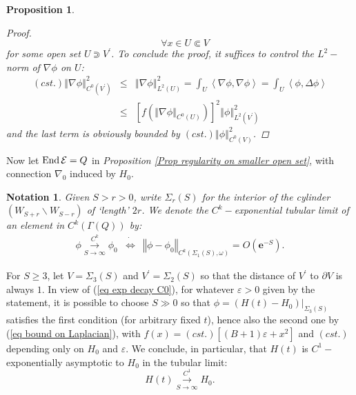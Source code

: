 \documentclass{article}
\newcommand{\func}[1]{\textnormal {#1\,}}
\newcommand{\e}[1]{\mathbf{e}^{#1}}
\newtheorem{notation}[theorem]{Notation}
\newtheorem{proposition}[theorem]{Proposition}
\begin{document}
\begin{proposition}
\begin{proof}
\begin{equation*}
        \quad \forall x\in U\Subset V
\end{equation*}%
for some open set $U\Supset V^{\prime }$. To conclude the proof, it
suffices to control the $L^{2}-$norm of $\nabla \phi $ on $U$: 
\begin{eqnarray*}
        \left( cst.\right) \left\Vert \nabla \phi \right\Vert^2 _{C^{0}\left(
V^{\prime }\right) } &\leq &\left\Vert \nabla \phi \right\Vert ^2_{L^{2}\left(
U\right) }=\int_{U}\left\langle \nabla \phi ,\nabla \phi \right\rangle 
=\int_{U}\left\langle
\phi ,\Delta \phi \right\rangle \\
&\leq &\left[f\left(\left\Vert \nabla \phi \right\Vert _{C^{0}\left( U\right)
}\right)\right]^{2}\left\Vert \phi \right\Vert _{L^{2}\left( V^{\prime }\right) }^{2}
\end{eqnarray*}%
and the last term is obviously bounded by $\left( cst.\right) \left\Vert
\phi \right\Vert _{C^{0}\left( V\right) }^{2}$.
\end{proof}
\end{proposition}

Now let $\func{End}\mathcal{E}=Q$ in \emph{Proposition \ref{Prop regularity on smaller open set}}, with connection $\nabla_0$ induced by $H_0$.

\begin{notation}        \label{Not finite cylinder}%
Given $S>r>0$, write $\Sigma _{r}\left( S\right) $ for the
interior of the cylinder $\left( W_{S+r}\smallsetminus
W_{S-r}\right) $ of `length' $2r$. We denote the \emph{$C^k-$exponential tubular limit} of an element in  $C^k\left(\Gamma(Q)\right)$ by:
\begin{eqnarray*}
        \phi \overset{C^k}{\underset{S\rightarrow\infty}{\longrightarrow}}\phi_{0}         & \dot{\Leftrightarrow}& \left\Vert \phi -\phi_{0} \right\Vert_{C^k\left( \Sigma_1(S),\omega \right)}=O\left( \e{-S} \right).
\end{eqnarray*}
\end{notation}

For $S\geq 3$, let $V=\Sigma _{3}\left( S\right) $ and $%
V^{\prime }=\Sigma _{2}\left( S\right) $ so that the distance of $V^{\prime }
$ to $\partial V$ is always $1$. In view of (\ref{eq exp decay C0}), for whatever $\varepsilon>0$  given by the statement, it is possible to choose $S\gg0$ so that $\phi=\left(\left.H\left( t\right) -H_{0}\right)\right\vert_{\Sigma_3(S)}$
satisfies the first condition (for arbitrary fixed $t$), hence also the
second one by (\ref{eq bound on Laplacian}), with  $f(x)=(cst.)\left[ \left(B+1\right)\varepsilon +x^2 \right]$ and $(cst.)$ depending only on $H_0$ and $\varepsilon$. We conclude, in particular, that $H(t)$ is  $C^1-$exponentially asymptotic to $H_0$ in the tubular limit:
\begin{equation}        \label{eq H decays in C1 as S -> infinity}
        H(t) \overset{C^1}{\underset{S\rightarrow\infty}{\longrightarrow}}H_{0}.
\end{equation}%
\end{document}

